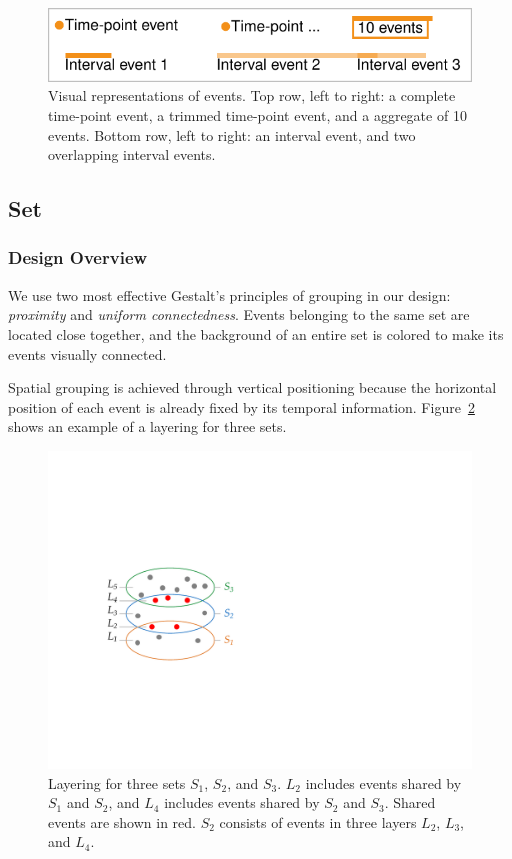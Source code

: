 \begin{figure}[!htb]
	\centering
	\includegraphics{figure2}\caption{Visual representations of events. Top row, left to right: a complete time-point event, a trimmed time-point event, and a aggregate of 10 events. Bottom row, left to right: an interval event, and two overlapping interval events.}
	\label{fig:event-representation}
\end{figure}

\subsection{Set}
\subsubsection{Design Overview}
We use two most effective Gestalt's principles of grouping in our design: \emph{proximity} and \emph{uniform connectedness}. Events belonging to the same set are located close together, and the background of an entire set is colored to make its events visually connected.

Spatial grouping is achieved through vertical positioning because the horizontal position of each event is already fixed by its temporal information. Figure~\ref{fig:layering} shows an example of a layering for three sets.

\begin{figure}[!htb]
	\centering
	\includegraphics[width=.5\columnwidth]{figure3}
	\caption{Layering for three sets $S_1$, $S_2$, and $S_3$. $L_2$ includes events shared by $S_1$ and $S_2$, and $L_4$ includes events shared by $S_2$ and $S_3$. Shared events are shown in red. $S_2$ consists of events in three layers $L_2$, $L_3$, and $L_4$.}
	\label{fig:layering}
\end{figure}

